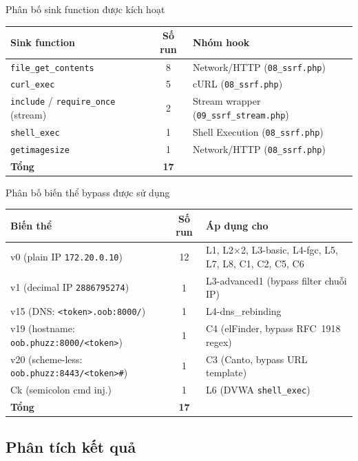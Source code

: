 \begin{table}[h]{Phân bố sink function được kích hoạt}
\label{tab:sinks}
\centering
\begin{tabular}{|l|c|l|}
\hline
\textbf{Sink function} & \textbf{Số run} & \textbf{Nhóm hook} \\
\hline
\texttt{file\_get\_contents}                      & 8  & Network/HTTP (\texttt{08\_ssrf.php}) \\
\texttt{curl\_exec}                                & 5  & cURL (\texttt{08\_ssrf.php}) \\
\texttt{include} / \texttt{require\_once} (stream) & 2  & Stream wrapper (\texttt{09\_ssrf\_stream.php}) \\
\texttt{shell\_exec}                               & 1  & Shell Execution (\texttt{08\_ssrf.php}) \\
\texttt{getimagesize}                              & 1  & Network/HTTP (\texttt{08\_ssrf.php}) \\
\hline
\textbf{Tổng}                                     & \textbf{17} & \\
\hline
\end{tabular}
\end{table}

\begin{table}[h]{Phân bố biến thể bypass được sử dụng}
\label{tab:variants}
\centering
\begin{tabular}{|l|c|l|}
\hline
\textbf{Biến thể} & \textbf{Số run} & \textbf{Áp dụng cho} \\
\hline
v0  (plain IP \texttt{172.20.0.10})
  & 12 & L1, L2$\times$2, L3-basic, L4-fgc, L5, L7, L8, C1, C2, C5, C6 \\
v1  (decimal IP \texttt{2886795274})
  & 1  & L3-advanced1 (bypass filter chuỗi IP) \\
v15 (DNS: \texttt{<token>.oob:8000/})
  & 1  & L4-dns\_rebinding \\
v19 (hostname: \texttt{oob.phuzz:8000/<token>})
  & 1  & C4 (elFinder, bypass RFC~1918 regex) \\
v20 (scheme-less: \texttt{oob.phuzz:8443/<token>\#})
  & 1  & C3 (Canto, bypass URL template) \\
Ck  (semicolon cmd inj.)
  & 1  & L6 (DVWA \texttt{shell\_exec}) \\
\hline
\textbf{Tổng} & \textbf{17} & \\
\hline
\end{tabular}
\end{table}

\subsection{Phân tích kết quả}

